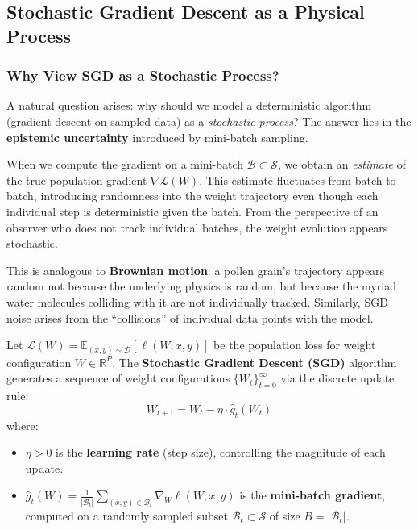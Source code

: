 \documentclass[
  journal=largetwo,
  simfonts=false,
  year=2025,
  volume=37,
]{cup-journal}
\begin{document}
\subsection{Stochastic Gradient Descent as a Physical Process}

\subsubsection{Why View SGD as a Stochastic Process?}

A natural question arises: why should we model a deterministic algorithm (gradient descent on sampled data) as a \textit{stochastic process}? The answer lies in the \textbf{epistemic uncertainty} introduced by mini-batch sampling.

When we compute the gradient on a mini-batch $\mathcal{B} \subset \mathcal{S}$, we obtain an \textit{estimate} of the true population gradient $\nabla \mathcal{L}(W)$. This estimate fluctuates from batch to batch, introducing randomness into the weight trajectory even though each individual step is deterministic given the batch. From the perspective of an observer who does not track individual batches, the weight evolution appears stochastic.

This is analogous to \textbf{Brownian motion}: a pollen grain's trajectory appears random not because the underlying physics is random, but because the myriad water molecules colliding with it are not individually tracked. Similarly, SGD noise arises from the ``collisions'' of individual data points with the model.

\begin{definition}\label{def:sgd_formal}
Let $\mathcal{L}(W) = \mathbb{E}_{(x,y)\sim\mathcal{D}}[\ell(W; x, y)]$ be the population loss for weight configuration $W \in \mathbb{R}^P$. The \textbf{Stochastic Gradient Descent (SGD)} algorithm generates a sequence of weight configurations $\{W_t\}_{t=0}^{\infty}$ via the discrete update rule:
\begin{equation}\label{eq:sgd_discrete}
    W_{t+1} = W_t - \eta \cdot \hat{g}_t(W_t)
\end{equation}
where:
\begin{itemize}
    \item $\eta > 0$ is the \textbf{learning rate} (step size), controlling the magnitude of each update.
    \item $\hat{g}_t(W) = \frac{1}{|\mathcal{B}_t|} \sum_{(x,y) \in \mathcal{B}_t} \nabla_W \ell(W; x, y)$ is the \textbf{mini-batch gradient}, computed on a randomly sampled subset $\mathcal{B}_t \subset \mathcal{S}$ of size $B = |\mathcal{B}_t|$.
\end{itemize}
\end{definition}
\end{document}
